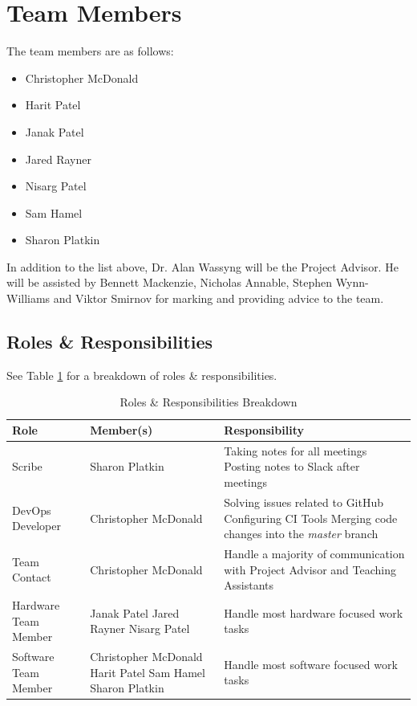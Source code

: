 \documentclass[11pt]{article}
\begin{document}
\section{Team Members}
The team members are as follows:
\begin{itemize}
\item Christopher McDonald
\item Harit Patel
\item Janak Patel
\item Jared Rayner
\item Nisarg Patel
\item Sam Hamel
\item Sharon Platkin
\end{itemize}
In addition to the list above, Dr. Alan Wassyng will be the Project Advisor. He will be assisted by Bennett Mackenzie, Nicholas Annable, Stephen Wynn-Williams and Viktor Smirnov for marking and providing advice to the team.
\subsection{Roles \& Responsibilities}
See Table \ref{rr} for a breakdown of roles \& responsibilities.
\begin{table}[H]
\centering
\caption{Roles \& Responsibilities Breakdown} 
\label{rr}
\begin{tabularx}{\textwidth}{| X | X | X |}
\hline
Role & Member(s) & Responsibility \\ \hline
Scribe & Sharon Platkin & Taking notes for all meetings \newline Posting notes to Slack after meetings  \\ \hline
DevOps Developer & Christopher McDonald & Solving issues related to GitHub \newline Configuring CI Tools \newline Merging code changes into the \textit{master} branch  \\ \hline
Team Contact & Christopher McDonald & Handle a majority of communication with Project Advisor and Teaching Assistants \\ \hline
Hardware Team Member & Janak Patel \newline Jared Rayner \newline Nisarg Patel & Handle most hardware focused work tasks \\ \hline
Software Team Member & Christopher McDonald \newline Harit Patel \newline Sam Hamel \newline Sharon Platkin & Handle most software focused work tasks \\ \hline
\end{tabularx}
\end{table}
\end{document}
